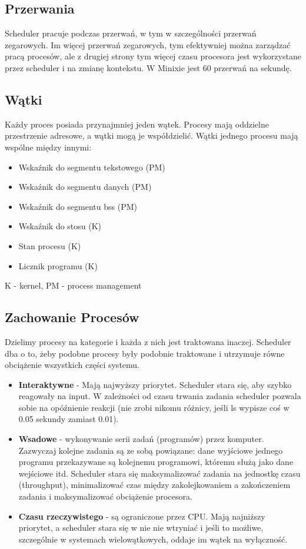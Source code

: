 \subsection{Przerwania}
Scheduler pracuje podczas przerwań, w tym w szczególności przerwań zegarowych. Im więcej przerwań zegarowych, tym efektywniej można zarządzać pracą procesów, ale z drugiej strony tym więcej czasu procesora jest wykorzystane przez scheduler i na zmianę kontekstu. W Minixie jest 60 przerwań na sekundę.
\subsection{Wątki}
Każdy proces posiada przynajmniej jeden wątek. Procesy mają oddzielne przestrzenie adresowe, a wątki mogą je współdzielić. Wątki jednego procesu mają wspólne między innymi:
\begin{itemize}
	\item Wskaźnik do segmentu tekstowego (PM)
	\item Wskaźnik do segmentu danych (PM)
	\item Wskaźnik do segmentu bss (PM)
	\item Wskaźnik do stosu (K)
	\item Stan procesu (K)
	\item Licznik programu (K)
\end{itemize}
K - kernel, PM - process management
\subsection{Zachowanie Procesów}
Dzielimy procesy na kategorie i każda z nich jest traktowana inaczej. Scheduler dba o to, żeby podobne procesy były podobnie traktowane i utrzymuje równe obciążenie wszystkich części systemu.
\begin{itemize}
	\item \textbf{Interaktywne} - Mają najwyższy priorytet. Scheduler stara się, aby szybko reagowały na input. W zależności od czasu trwania zadania scheduler pozwala sobie na opóźnienie reakcji (nie zrobi nikomu różnicy, jeśli ls wypisze coś w 0.05 sekundy zamiast 0.01).
	\item \textbf{Wsadowe} - wykonywanie serii zadań (programów) przez komputer. Zazwyczaj kolejne zadania są ze sobą powiązane: dane wyjściowe jednego programu przekazywane są kolejnemu programowi, któremu służą jako dane wejściowe itd. Scheduler stara się maksymalizować zadania na jednostkę czasu (throughput), minimalizować czas między zakolejkowaniem a zakończeniem zadania i maksymalizować obciążenie procesora.
	\item \textbf{Czasu rzeczywistego} - są ograniczone przez CPU. Mają najniższy priorytet, a scheduler stara się w nie nie wtryniać i jeśli to możliwe, szczególnie w systemach wielowątkowych, oddaje im wątek na wyłączność.
\end{itemize}
